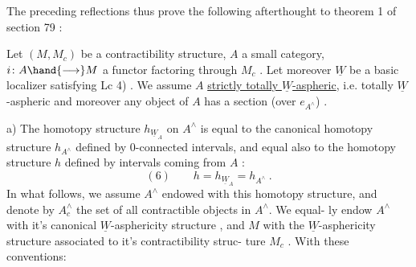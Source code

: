 
The preceding reflections thus prove the following afterthought to
theorem 1 of section 79 :

 Let $(M,M_c)$ be a contractibility structure, $A$ a small
category, $i\colon A\hand{\longrightarrow} M$ a functor factoring through $M_c$ .  Let
moreover $\underline{W}$ be a basic localizer satisfying Lc 4) . We assume $A$
 \uline{strictly totally $\underline{W}$-aspheric}, i.e. totally $\underline{W}$-aspheric and
moreover any object of $A$ has a section (over $e_{A^\wedge}$) .

a) The homotopy structure $h_{\underline{W}_A}$ on $A^\wedge$ is equal to the canonical
homotopy structure $h_{A^\wedge}$ defined by 0-connected intervals, and equal
also to the homotopy structure $h$ defined by intervals coming from $A$ :
\[ (6) \qquad h = h_{\underline{W}_A} = h_{A^\wedge} \ . \]
In what follows, we assume $A^\wedge$ endowed with this homotopy structure,
and denote by $A^\wedge_c$ the set of all contractible objects in $A^\wedge$. We equal-%
ly endow $A^\wedge$ with it's canonical $\underline{W}$-asphericity structure , and $M$ with
the $\underline{W}$-asphericity structure associated to it's contractibility struc-%
ture $M_c$ . With these conventions:

